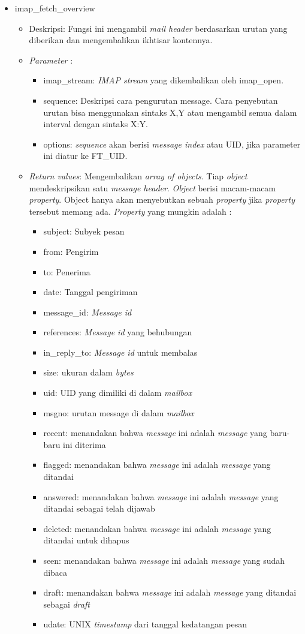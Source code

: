 \begin{itemize}
\item imap\_fetch\_overview
\begin{itemize}
\item Deskripsi: Fungsi ini mengambil \textit{mail header} berdasarkan urutan yang diberikan dan mengembalikan ikhtisar kontennya.
\item \textit{Parameter} :
\begin{itemize}
\item imap\_stream: \textit{IMAP stream} yang dikembalikan oleh imap\_open.
\item sequence: Deskripsi cara pengurutan message. Cara penyebutan urutan bisa menggunakan sintaks X,Y atau mengambil semua dalam interval dengan sintaks X:Y.
\item options: \textit{sequence} akan berisi \textit{message index} atau UID, jika parameter ini diatur ke FT\_UID.
\end{itemize}
\item \textit{Return values}: Mengembalikan \textit{array of objects}. Tiap \textit{object} mendeskripsikan satu \textit{message header}. \textit{Object} berisi macam-macam \textit{property}. Object hanya akan menyebutkan sebuah \textit{property} jika \textit{property} tersebut memang ada. \textit{Property} yang mungkin adalah :
 \begin{itemize}
 \item subject: Subyek pesan
 \item from: Pengirim
 \item to: Penerima
 \item date: Tanggal pengiriman
 \item message\_id: \textit{Message id}
 \item references: \textit{Message id} yang behubungan
 \item in\_reply\_to: \textit{Message id} untuk membalas
 \item size: ukuran dalam \textit{bytes}
 \item uid: UID yang dimiliki di dalam \textit{mailbox}
 \item msgno: urutan message di dalam \textit{mailbox}
 \item recent: menandakan bahwa \textit{message} ini adalah \textit{message} yang baru-baru ini diterima
 \item flagged: menandakan bahwa \textit{message} ini adalah \textit{message} yang ditandai
 \item answered: menandakan bahwa \textit{message} ini adalah \textit{message} yang ditandai sebagai telah dijawab
 \item deleted: menandakan bahwa \textit{message} ini adalah \textit{message} yang ditandai untuk dihapus
 \item seen: menandakan bahwa \textit{message} ini adalah \textit{message} yang sudah dibaca
 \item draft: menandakan bahwa \textit{message} ini adalah \textit{message} yang ditandai sebagai \textit{draft}
 \item udate: UNIX \textit{timestamp} dari tanggal kedatangan pesan
 \end{itemize} 
\end{itemize}
 

\end{itemize}

